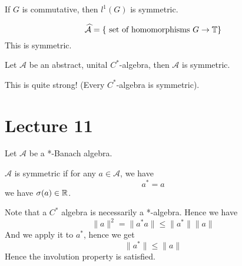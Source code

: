 \begin{proposition}
    If $G$ is commutative, then $l^1(G)$ is symmetric.
\end{proposition}
\begin{equation*}
    \widehat{\mathcal{A}}=\{\text{ set of homomorphisms } G\to\mathbb{T}\}
\end{equation*}
This is symmetric.

\begin{proposition}
    Let $\mathcal{A}$ be an abstract, unital $C^*$-algebra, then $\mathcal{A}$ is symmetric.
\end{proposition}
This is quite strong! (Every $C^*$-algebra is symmetric).



\section*{Lecture 11}
Let $\mathcal{A}$ be a *-Banach algebra.
\begin{definition}
    $\mathcal{A}$ is symmetric if for any $a\in\mathcal{A}$, we have
    \begin{equation*}
        a^*=a
    \end{equation*}
    we have $\sigma(a)\in\mathbb{R}$.
\end{definition}

Note that a $C^*$ algebra is necessarily a *-algebra. Hence we have
\begin{equation*}
    \|a\|^2=\|a^*a\|\leq\|a^*\|\|a\|
\end{equation*}
And we apply it to $a^*$, hence we get
\begin{equation*}
    \|a^*\|\leq\|a\|
\end{equation*}
Hence the involution property is satisfied.

